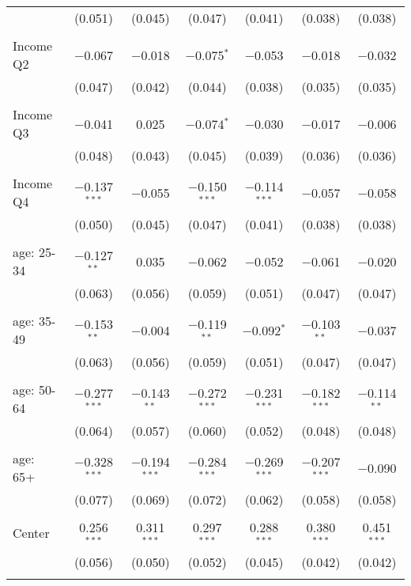 \begin{tabular}{@{\extracolsep{5pt}}lcccccc}
  & (0.051) & (0.045) & (0.047) & (0.041) & (0.038) & (0.038) \\ 
  & & & & & & \\ 
 Income Q2 & $-$0.067 & $-$0.018 & $-$0.075$^{*}$ & $-$0.053 & $-$0.018 & $-$0.032 \\ 
  & (0.047) & (0.042) & (0.044) & (0.038) & (0.035) & (0.035) \\ 
  & & & & & & \\ 
 Income Q3 & $-$0.041 & 0.025 & $-$0.074$^{*}$ & $-$0.030 & $-$0.017 & $-$0.006 \\ 
  & (0.048) & (0.043) & (0.045) & (0.039) & (0.036) & (0.036) \\ 
  & & & & & & \\ 
 Income Q4 & $-$0.137$^{***}$ & $-$0.055 & $-$0.150$^{***}$ & $-$0.114$^{***}$ & $-$0.057 & $-$0.058 \\ 
  & (0.050) & (0.045) & (0.047) & (0.041) & (0.038) & (0.038) \\ 
  & & & & & & \\ 
 age: 25-34 & $-$0.127$^{**}$ & 0.035 & $-$0.062 & $-$0.052 & $-$0.061 & $-$0.020 \\ 
  & (0.063) & (0.056) & (0.059) & (0.051) & (0.047) & (0.047) \\ 
  & & & & & & \\ 
 age: 35-49 & $-$0.153$^{**}$ & $-$0.004 & $-$0.119$^{**}$ & $-$0.092$^{*}$ & $-$0.103$^{**}$ & $-$0.037 \\ 
  & (0.063) & (0.056) & (0.059) & (0.051) & (0.047) & (0.047) \\ 
  & & & & & & \\ 
 age: 50-64 & $-$0.277$^{***}$ & $-$0.143$^{**}$ & $-$0.272$^{***}$ & $-$0.231$^{***}$ & $-$0.182$^{***}$ & $-$0.114$^{**}$ \\ 
  & (0.064) & (0.057) & (0.060) & (0.052) & (0.048) & (0.048) \\ 
  & & & & & & \\ 
 age: 65+ & $-$0.328$^{***}$ & $-$0.194$^{***}$ & $-$0.284$^{***}$ & $-$0.269$^{***}$ & $-$0.207$^{***}$ & $-$0.090 \\ 
  & (0.077) & (0.069) & (0.072) & (0.062) & (0.058) & (0.058) \\ 
  & & & & & & \\ 
 Center & 0.256$^{***}$ & 0.311$^{***}$ & 0.297$^{***}$ & 0.288$^{***}$ & 0.380$^{***}$ & 0.451$^{***}$ \\ 
  & (0.056) & (0.050) & (0.052) & (0.045) & (0.042) & (0.042) \\ 
  & & & & & & \\ 

\end{tabular}
